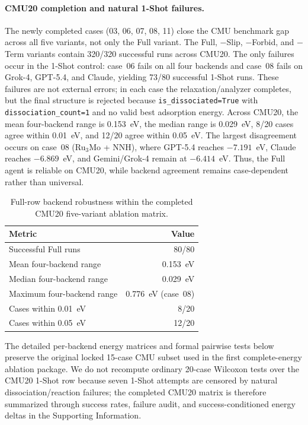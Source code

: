 \paragraph{CMU20 completion and natural 1-Shot failures.}
The newly completed cases (03, 06, 07, 08, 11) close the CMU benchmark gap across all five variants, not only the Full variant.
The Full, $-$Slip, $-$Forbid, and $-$Term variants contain 320/320 successful runs across CMU20.
The only failures occur in the 1-Shot control: case~06 fails on all four backends and case~08 fails on Grok-4, GPT-5.4, and Claude, yielding 73/80 successful 1-Shot runs.
These failures are not external errors; in each case the relaxation/analyzer completes, but the final structure is rejected because \texttt{is\_dissociated=True} with \texttt{dissociation\_count=1} and no valid best adsorption energy.
Across CMU20, the mean four-backend range is 0.153~eV, the median range is 0.029~eV, 8/20 cases agree within 0.01~eV, and 12/20 agree within 0.05~eV.
The largest disagreement occurs on case~08 (Ru$_3$Mo + NNH), where GPT-5.4 reaches $-7.191$~eV, Claude reaches $-6.869$~eV, and Gemini/Grok-4 remain at $-6.414$~eV.
Thus, the Full agent is reliable on CMU20, while backend agreement remains case-dependent rather than universal.

\begin{table}[t]
\centering
\caption{Full-row backend robustness within the completed CMU20 five-variant ablation matrix.}
\label{tab:cmu20-full-completion}
\begin{tabular}{lr}
\toprule
Metric & Value \\
\midrule
Successful Full runs & 80/80 \\
Mean four-backend range & 0.153~eV \\
Median four-backend range & 0.029~eV \\
Maximum four-backend range & 0.776~eV (case~08) \\
Cases within 0.01~eV & 8/20 \\
Cases within 0.05~eV & 12/20 \\
\bottomrule
\end{tabular}
\end{table}

The detailed per-backend energy matrices and formal pairwise tests below preserve the original locked 15-case CMU subset used in the first complete-energy ablation package.
We do not recompute ordinary 20-case Wilcoxon tests over the CMU20 1-Shot row because seven 1-Shot attempts are censored by natural dissociation/reaction failures; the completed CMU20 matrix is therefore summarized through success rates, failure audit, and success-conditioned energy deltas in the Supporting Information.


